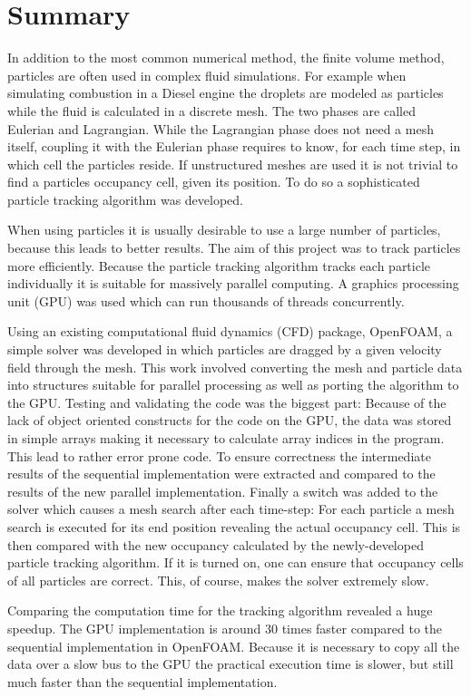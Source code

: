 
\section*{Summary}

In addition to the most common numerical method, the finite volume method, particles are often used in complex fluid simulations. For example when simulating combustion in a Diesel engine the droplets are modeled as particles while the fluid is calculated in a discrete mesh. The two phases are called Eulerian and Lagrangian. While the Lagrangian phase does not need a mesh itself, coupling it with the Eulerian phase requires to know, for each time step, in which cell the particles reside. If unstructured meshes are used it is not trivial to find a particles occupancy cell, given its position. To do so a sophisticated particle tracking algorithm was developed.

When using particles it is usually desirable to use a large number of particles, because this leads to better results. The aim of this project was to track particles more efficiently. Because the particle tracking algorithm tracks each particle individually it is suitable for massively parallel computing. A graphics processing unit (GPU) was used which can run thousands of threads concurrently.

Using an existing computational fluid dynamics (CFD) package, OpenFOAM, a simple solver was developed in which particles are dragged by a given velocity field through the mesh. This work involved converting the mesh and particle data into structures suitable for parallel processing as well as porting the algorithm to the GPU. Testing and validating the code was the biggest part: Because of the lack of object oriented constructs for the code on the GPU, the data was stored in simple arrays making it necessary to calculate array indices in the program. This lead to rather error prone code. To ensure correctness the intermediate results of the sequential implementation were extracted and compared to the results of the new parallel implementation. Finally a switch was added to the solver which causes a mesh search after each time-step: For each particle a mesh search is executed for its end position revealing the actual occupancy cell. This is then compared with the new occupancy calculated by the newly-developed  particle tracking algorithm.  If it is turned on, one can ensure that occupancy cells of all particles are correct. This, of course, makes the solver extremely slow.

Comparing the computation time for the tracking algorithm revealed a huge speedup. The GPU implementation is around 30 times faster compared to the sequential implementation in OpenFOAM. Because it is necessary to copy all the data over a slow bus to the GPU the practical execution time is slower, but still much faster than the sequential implementation.